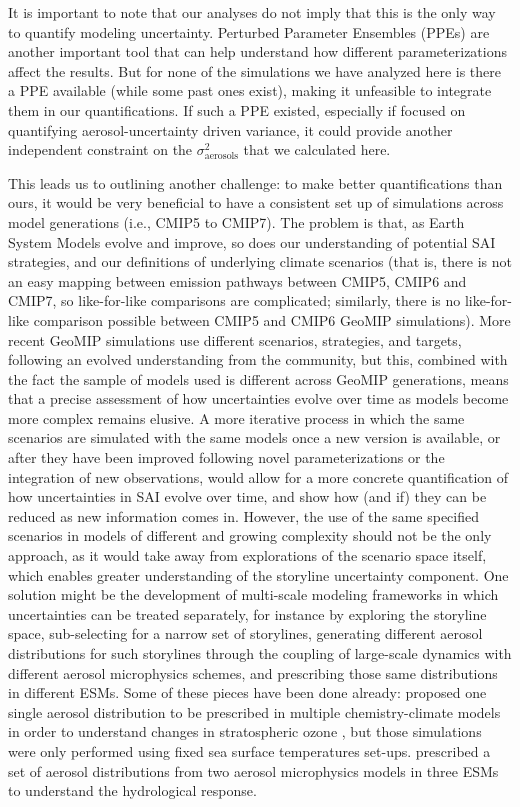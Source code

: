 \documentclass[draft]{agujournal2019}
\begin{document}
It is important to note that our analyses do not imply that this is the only way to quantify modeling uncertainty. Perturbed Parameter Ensembles (PPEs) are another important tool that can help understand how different parameterizations affect the results. But for none of the simulations we have analyzed here is there a PPE available (while some past ones exist), making it unfeasible to integrate them in our quantifications. If such a PPE existed, especially if focused on quantifying aerosol-uncertainty driven variance, it could provide another independent constraint on the $\sigma^2_{\mathrm{aerosols}}$ that we calculated here.

This leads us to outlining another challenge: to make better quantifications than ours, it would be very beneficial to have a consistent set up of simulations across model generations (i.e., CMIP5 to CMIP7). The problem is that, as Earth System Models evolve and improve, so does our understanding of potential SAI strategies, and our definitions of underlying climate scenarios (that is, there is not an easy mapping between emission pathways between CMIP5, CMIP6 and CMIP7, so like-for-like comparisons are complicated; similarly, there is no like-for-like comparison possible between CMIP5 and CMIP6 GeoMIP simulations). More recent GeoMIP simulations use different scenarios, strategies, and targets, following an evolved understanding from the community, but this, combined with the fact the sample of models used is different across GeoMIP generations, means that a precise assessment of how uncertainties evolve over time as models become more complex remains elusive. A more iterative process \cite <as proposed for instance by>[]{visioni_living2024} in which the same scenarios are simulated with the same models once a new version is available, or after they have been improved following novel parameterizations or the integration of new observations, would allow for a more concrete quantification of how uncertainties in SAI evolve over time, and show how (and if) they can be reduced as new information comes in. However, the use of the same specified scenarios in models of different and growing complexity should not be the only approach, as it would take away from explorations of the scenario space itself, which enables greater understanding of the storyline uncertainty component. One solution might be the development of multi-scale modeling frameworks in which uncertainties can be treated separately, for instance by exploring the storyline space, sub-selecting for a narrow set of storylines, generating different aerosol distributions for such storylines through the coupling of large-scale dynamics with different aerosol microphysics schemes, and prescribing those same distributions in different ESMs. Some of these pieces have been done already:  proposed one single aerosol distribution to be prescribed in multiple chemistry-climate models in order to understand changes in stratospheric ozone \cite{jorimann2026middle}, but those simulations were only performed using fixed sea surface temperatures set-ups.  prescribed a set of aerosol distributions from two aerosol microphysics models in three ESMs to understand the hydrological response. 
\end{document}
